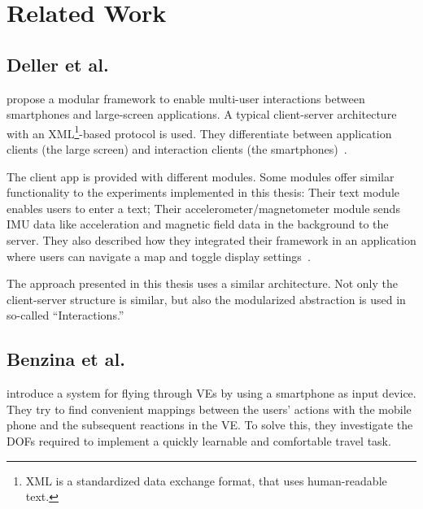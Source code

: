\chapter{Related Work}\label{chapter:related-work}


\section{Deller et al.}\label{section:deller-2011}
\citeauthor{Deller.2011} propose a modular framework to enable multi-user interactions between smartphones and large-screen applications. A typical client-server architecture with an XML\footnote{XML is a standardized data exchange format, that uses human-readable text.}-based protocol is used. They differentiate between application clients (the large screen) and interaction clients (the smartphones)~\cite{Deller.2011}.

The client app is provided with different modules. Some modules offer similar functionality to the experiments implemented in this thesis: Their text module enables users to enter a text; Their accelerometer/magnetometer module sends \gls{IMU} data like acceleration and magnetic field data in the background to the server. They also described how they integrated their framework in an application where users can navigate a map and toggle display settings~\cite{Deller.2011}.

The approach presented in this thesis uses a similar architecture. Not only the client-server structure is similar, but also the modularized abstraction is used in so-called \enquote{Interactions.}


\section{Benzina et al.}\label{section:benzina-2011}
\citeauthor{Benzina.2011} introduce a system for flying through \glspl{VE} by using a smartphone as input device.
They try to find convenient mappings between the users' actions with the mobile phone and the subsequent reactions in the \gls{VE}. To solve this, they investigate the \glspl{DOF} required to implement a quickly learnable and comfortable travel task.

